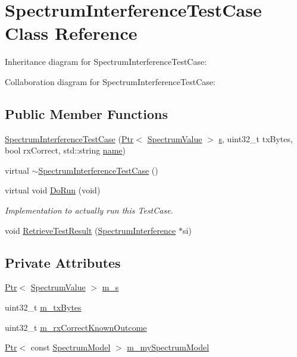 \hypertarget{classSpectrumInterferenceTestCase}{}\section{Spectrum\+Interference\+Test\+Case Class Reference}
\label{classSpectrumInterferenceTestCase}


Inheritance diagram for Spectrum\+Interference\+Test\+Case\+:


Collaboration diagram for Spectrum\+Interference\+Test\+Case\+:
\subsection*{Public Member Functions}
\begin{DoxyCompactItemize}
\item 
\hyperlink{classSpectrumInterferenceTestCase_a7fac49e7028a0bb3dafedb21e3069a94}{Spectrum\+Interference\+Test\+Case} (\hyperlink{classns3_1_1Ptr}{Ptr}$<$ \hyperlink{classns3_1_1SpectrumValue}{Spectrum\+Value} $>$ \hyperlink{generate__test__data__lte__sinr_8m_ad83eeb3a142285d1243a08c6b7026df8}{s}, uint32\+\_\+t tx\+Bytes, bool rx\+Correct, std\+::string \hyperlink{generate__test__data__lte__spectrum__model_8m_ab74e6bf80237ddc4109968cedc58c151}{name})
\item 
virtual \hyperlink{classSpectrumInterferenceTestCase_aea6ded0dbeca1b2bdb7360cca3ed72c0}{$\sim$\+Spectrum\+Interference\+Test\+Case} ()
\item 
virtual void \hyperlink{classSpectrumInterferenceTestCase_a5ac9568ed05b26e38fea7c409805e7e0}{Do\+Run} (void)
\begin{DoxyCompactList}\small\item\em Implementation to actually run this Test\+Case. \end{DoxyCompactList}\item 
void \hyperlink{classSpectrumInterferenceTestCase_a9a2d4412deeda68a10c606e29ae27c30}{Retrieve\+Test\+Result} (\hyperlink{classns3_1_1SpectrumInterference}{Spectrum\+Interference} $\ast$si)
\end{DoxyCompactItemize}
\subsection*{Private Attributes}
\begin{DoxyCompactItemize}
\item 
\hyperlink{classns3_1_1Ptr}{Ptr}$<$ \hyperlink{classns3_1_1SpectrumValue}{Spectrum\+Value} $>$ \hyperlink{classSpectrumInterferenceTestCase_a4bd1bb6c7ac90a2ad710183359867f56}{m\+\_\+s}
\item 
uint32\+\_\+t \hyperlink{classSpectrumInterferenceTestCase_a880beadd18916a76221e6d6eb7d761f7}{m\+\_\+tx\+Bytes}
\item 
uint32\+\_\+t \hyperlink{classSpectrumInterferenceTestCase_a268077aa81eb5cdbedbce6381bc1779e}{m\+\_\+rx\+Correct\+Known\+Outcome}
\item 
\hyperlink{classns3_1_1Ptr}{Ptr}$<$ const \hyperlink{classns3_1_1SpectrumModel}{Spectrum\+Model} $>$ \hyperlink{classSpectrumInterferenceTestCase_aabc7b5e184368e1912653f66ad1330df}{m\+\_\+my\+Spectrum\+Model}
\end{DoxyCompactItemize}
